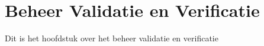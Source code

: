 \chapter{Beheer Validatie en Verificatie}
Dit is het hoofdstuk over het beheer validatie en verificatie




